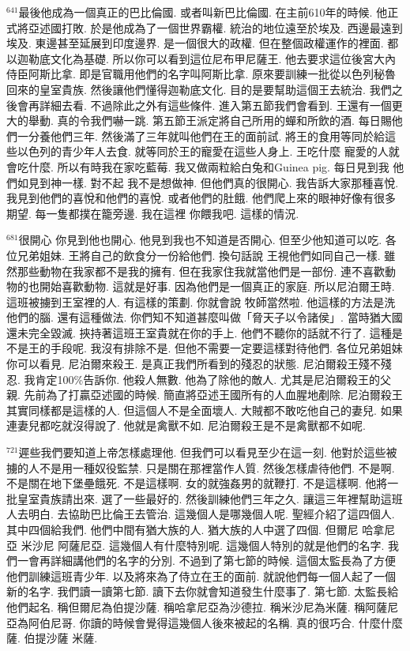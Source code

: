 \documentclass{book}
\begin{document}
$^{641}$最後他成為一個真正的巴比倫國.
或者叫新巴比倫國.
在主前610年的時候.
他正式將亞述國打敗.
於是他成為了一個世界霸權.
統治的地位遠至於埃及.
西邊最遠到埃及.
東邊甚至延展到印度邊界.
是一個很大的政權.
但在整個政權運作的裡面.
都以迦勒底文化為基礎.
所以你可以看到這位尼布甲尼薩王.
他去要求這位後宮大內侍臣阿斯比拿.
即是官職用他們的名字叫阿斯比拿.
原來要訓練一批從以色列秘魯回來的皇室貴族.
然後讓他們懂得迦勒底文化.
目的是要幫助這個王去統治.
我們之後會再詳細去看.
不過除此之外有這些條件.
進入第五節我們會看到.
王還有一個更大的舉動.
真的令我們嚇一跳.
第五節王派定將自己所用的蟬和所飲的酒.
每日賜他們一分養他們三年.
然後滿了三年就叫他們在王的面前試.
將王的食用等同於給這些以色列的青少年人去食.
就等同於王的寵愛在這些人身上.
王吃什麼 寵愛的人就會吃什麼.
所以有時我在家吃藍莓.
我又做兩粒給白兔和Guinea pig.
每日見到我 他們如見到神一樣.
對不起 我不是想做神.
但他們真的很開心.
我告訴大家那種喜悅.
我見到他們的喜悅和他們的喜悅.
或者他們的肚餓.
他們爬上來的眼神好像有很多期望.
每一隻都撲在籠旁邊.
我在這裡 你餵我吧.
這樣的情況.

$^{681}$很開心 你見到他也開心.
他見到我也不知道是否開心.
但至少他知道可以吃.
各位兄弟姐妹.
王將自己的飲食分一份給他們.
換句話說 王視他們如同自己一樣.
雖然那些動物在我家都不是我的擁有.
但在我家住我就當他們是一部份.
連不喜歡動物的也開始喜歡動物.
這就是好事.
因為他們是一個真正的家庭.
所以尼泊爾王時.
這班被擄到王室裡的人.
有這樣的策劃.
你就會說 牧師當然啦.
他這樣的方法是洗他們的腦.
還有這種做法.
你們知不知道甚麼叫做「脅天子以令諸侯」.
當時猶大國還未完全毀滅.
挾持著這班王室貴就在你的手上.
他們不聽你的話就不行了.
這種是不是王的手段呢.
我沒有排除不是.
但他不需要一定要這樣對待他們.
各位兄弟姐妹 你可以看見.
尼泊爾來殺王.
是真正我們所看到的殘忍的狀態.
尼泊爾殺王殘不殘忍.
我肯定100\%告訴你.
他殺人無數.
他為了除他的敵人.
尤其是尼泊爾殺王的父親.
先前為了打贏亞述國的時候.
簡直將亞述王國所有的人血腥地剷除.
尼泊爾殺王其實同樣都是這樣的人.
但這個人不是全面壞人.
大賊都不敢吃他自己的妻兒.
如果連妻兒都吃就沒得說了.
他就是禽獸不如.
尼泊爾殺王是不是禽獸都不如呢.

$^{721}$遲些我們要知道上帝怎樣處理他.
但我們可以看見至少在這一刻.
他對於這些被擄的人不是用一種奴役監禁.
只是關在那裡當作人質.
然後怎樣虐待他們.
不是啊.
不是關在地下堡壘餓死.
不是這樣啊.
女的就強姦男的就鞭打.
不是這樣啊.
他將一批皇室貴族請出來.
選了一些最好的.
然後訓練他們三年之久.
讓這三年裡幫助這班人去明白.
去協助巴比倫王去管治.
這幾個人是哪幾個人呢.
聖經介紹了這四個人.
其中四個給我們.
他們中間有猶大族的人.
猶大族的人中選了四個.
但爾尼 哈拿尼亞 米沙尼 阿薩尼亞.
這幾個人有什麼特別呢.
這幾個人特別的就是他們的名字.
我們一會再詳細講他們的名字的分別.
不過到了第七節的時候.
這個太監長為了方便他們訓練這班青少年.
以及將來為了侍立在王的面前.
就說他們每一個人起了一個新的名字.
我們讀一讀第七節.
讀下去你就會知道發生什麼事了.
第七節.
太監長給他們起名.
稱但爾尼為伯提沙薩.
稱哈拿尼亞為沙德拉.
稱米沙尼為米薩.
稱阿薩尼亞為阿伯尼哥.
你讀的時候會覺得這幾個人後來被起的名稱.
真的很巧合.
什麼什麼薩.
伯提沙薩 米薩.
\end{document}

